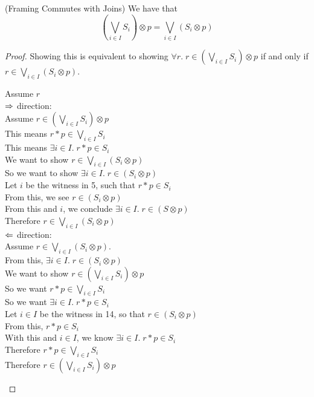 \begin{lemma}{(Framing Commutes with Joins)}
We have that 
\begin{displaymath}
\left(\bigvee_{i \in I} S_i\right) \otimes p = \bigvee_{i \in I} (S_i \otimes p)
\end{displaymath}
\end{lemma}

\begin{proof}
Showing this is equivalent to showing $\forall r.\; r \in
\left(\bigvee_{i \in I} S_i\right) \otimes p$ if and only if $r \in
\bigvee_{i \in I} (S_i \otimes p)$.

\begin{tabbedproof}
\oo Assume $r$ \\[0.5em]
\ooo  $\Rightarrow$ direction: \\
\oooo Assume $r \in \left(\bigvee_{i \in I} S_i\right) \otimes p$ \\
\oooo This means $r * p \in \bigvee_{i \in I} S_i$ \\
\oooo This means $\exists i \in I.\; r * p \in S_i$ \\
\oooo We want to show $r \in \bigvee_{i \in I} (S_i \otimes p)$ \\
\oooo So we want to show $\exists i \in I.\; r \in (S_i \otimes p)$ \\
\oooo Let $i$ be the witness in 5, such that $r * p \in S_i$ \\
\ooooo From this, we see $r \in (S_i \otimes p)$ \\
\ooooo From this and $i$, we conclude $\exists i \in I.\; r \in (S \otimes p)$ \\
\oooo Therefore $r \in \bigvee_{i \in I} (S_i \otimes p)$ \\[0.5em]

\ooo $\Leftarrow$ direction: \\
\oooo Assume $r \in \bigvee_{i \in I} (S_i \otimes p)$. \\
\ooooo From this, $\exists i \in I.\; r \in (S_i \otimes p)$ \\
\ooooo We want to show $r \in \left(\bigvee_{i \in I} S_i\right) \otimes p$ \\
\ooooo So we want $r * p \in \bigvee_{i \in I} S_i$ \\
\ooooo So we want $\exists i \in I.\; r * p \in S_i$ \\
\ooooo Let $i \in I$ be the witness in 14, so that $r \in (S_i \otimes p)$ \\
\oooooo From this, $r * p \in S_i$ \\
\oooooo With this and $i \in I$, we know $\exists i \in I.\; r * p \in S_i$ \\
\ooooo Therefore $r * p \in \bigvee_{i \in I} S_i$ \\
\ooooo Therefore $r \in \left(\bigvee_{i \in I} S_i\right) \otimes p$ \\
\end{tabbedproof}
\end{proof}

